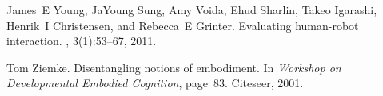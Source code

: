 \documentclass{ut-thesis}
\begin{document}
\begin{thebibliography}{100}
James~E Young, JaYoung Sung, Amy Voida, Ehud Sharlin, Takeo Igarashi, Henrik~I
  Christensen, and Rebecca~E Grinter.
\newblock Evaluating human-robot interaction.
, 3(1):53--67, 2011.

Tom Ziemke.
\newblock Disentangling notions of embodiment.
\newblock In {\em Workshop on Developmental Embodied Cognition}, page~83.
  Citeseer, 2001.

\end{thebibliography}


\end{document}
